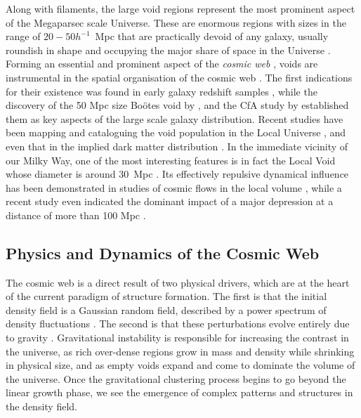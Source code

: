Along with filaments, the large void regions represent the most prominent aspect of the Megaparsec scale Universe. These are enormous regions 
with sizes in the range of $20-50h^{-1}$~Mpc that are practically devoid of any galaxy, usually roundish in shape and occupying the major 
share of space in the Universe \citep[see][for a recent review]{Iau308}.  Forming an essential and prominent aspect of the 
{\it cosmic web} \citep{Bond1996}, voids are instrumental in the spatial organisation of the cosmic web \citep{Icke1984,Sahni1994,
Sheth2003b,Aragon-Calvo2012}. The first indications for their existence was found in early galaxy redshift samples 
\citep{Gregory1978,Zeldovich1982}, while the discovery of the 50 Mpc size Bo\"otes void by \cite{Kirshner1981}, \cite{Kirshner1987} 
and the CfA study by \cite{Lapparent1986} established them as key aspects of the large scale galaxy distribution. Recent studies have 
been mapping and cataloguing the void population in the Local Universe \citep{Pan2012,Sutter2012}, and even that in the implied dark 
matter distribution \citep{Leclercq2015b}. In the immediate vicinity of our Milky Way, one of the most interesting features 
is in fact the Local Void whose diameter is around 30~Mpc \citep{Tully1987}. Its effectively repulsive dynamical influence 
has been demonstrated in studies of cosmic flows in the local volume \citep{Tully2008}, while a recent study even indicated the 
dominant impact of a major depression at a distance of more than 100 Mpc \citep[the so-called ``dipole repeller'',][]{Hoffman2017}. 

\subsection{Physics and Dynamics of the Cosmic Web}
The cosmic web is a direct result of two physical drivers, which are at the heart of the current paradigm of structure formation. 
The first is that the initial density field is a Gaussian random field, described by a power spectrum of density fluctuations \citep{Adler1981,bbks}. The second is that these perturbations evolve entirely due to gravity \citep{Peebles1980}. Gravitational instability is responsible 
for increasing the contrast in the universe, as rich over-dense regions grow in mass and density while shrinking in physical size, and as empty 
voids expand and come to dominate the volume of the universe. Once the gravitational clustering process begins to go beyond the 
linear growth phase, we see the emergence of complex patterns and structures in the density field. 


